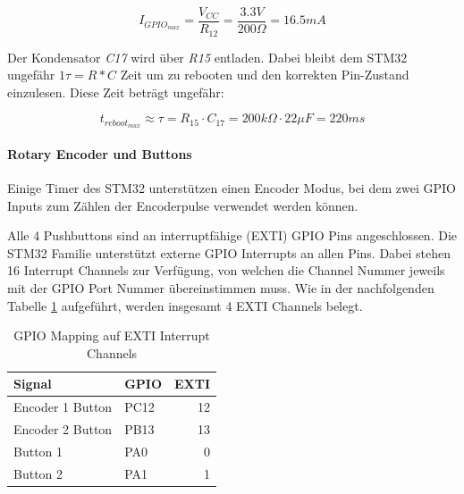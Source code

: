\begin{equation}
I_{GPIO_{max}}=\frac{V_{CC}}{R_{12}}=\frac{3.3\si{V}}{200\si{\Omega}}=16.5\si{mA}
\end{equation}

Der Kondensator \textit{C17} wird über \textit{R15} entladen. Dabei bleibt dem STM32 ungefähr $1\tau=R*C$ Zeit um zu rebooten und den korrekten Pin-Zustand einzulesen. Diese Zeit beträgt ungefähr:

\begin{equation}
t_{reboot_{max}} \approx \tau = R_{15}\cdot C_{17} = 200\si{k\Omega}\cdot 22\si{\mu F}=220\si{ms}
\end{equation}


\paragraph{Rotary Encoder und Buttons}

Einige Timer des STM32 unterstützen einen Encoder Modus, bei dem zwei GPIO Inputs zum Zählen der Encoderpulse verwendet werden können.

Alle 4 Pushbuttons sind an interruptfähige (EXTI) GPIO Pins angeschlossen. 
Die STM32 Familie unterstützt externe GPIO Interrupts an allen Pins. 
Dabei stehen 16 Interrupt Channels zur Verfügung, von welchen die Channel Nummer jeweils mit der GPIO Port Nummer übereinstimmen muss. 
Wie in der nachfolgenden Tabelle \ref{tab:EXTIPins} aufgeführt, werden insgesamt 4 EXTI Channels belegt.

\begin{table}[H]
	\centering
	\begin{tabular}{|l|l|r|}
	\hline
	\textbf{Signal}  & \textbf{GPIO} & \textbf{EXTI} \\ \hline
	Encoder 1 Button & PC12          & 12            \\ \hline
	Encoder 2 Button & PB13          & 13            \\ \hline
	Button 1         & PA0           & 0             \\ \hline
	Button 2         & PA1           & 1             \\ \hline
	\end{tabular}
	\caption{GPIO Mapping auf EXTI Interrupt Channels}
	\label{tab:EXTIPins}
\end{table}




